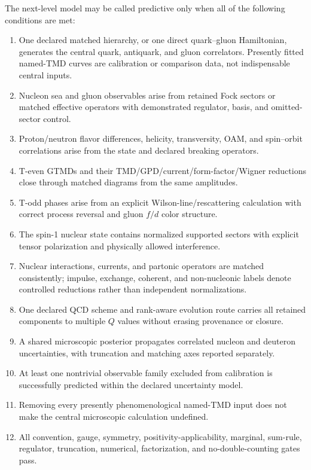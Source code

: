 \documentclass[11pt]{article}
\begin{document}
The next-level model may be called predictive only when all of the following
conditions are met:
\begin{enumerate}
\item One declared matched hierarchy, or one direct quark--gluon Hamiltonian,
generates the central quark, antiquark, and gluon correlators.  Presently
fitted named-TMD curves are calibration or comparison data, not indispensable
central inputs.
\item Nucleon sea and gluon observables arise from retained Fock sectors or
matched effective operators with demonstrated regulator, basis, and omitted-
sector control.
\item Proton/neutron flavor differences, helicity, transversity, OAM, and
spin--orbit correlations arise from the state and declared breaking
operators.
\item T-even GTMDs and their TMD/GPD/current/form-factor/Wigner reductions
close through matched diagrams from the same amplitudes.
\item T-odd phases arise from an explicit Wilson-line/rescattering
calculation with correct process reversal and gluon \(f/d\) color structure.
\item The spin-1 nuclear state contains normalized supported sectors with
explicit tensor polarization and physically allowed interference.
\item Nuclear interactions, currents, and partonic operators are matched
consistently; impulse, exchange, coherent, and non-nucleonic labels denote
controlled reductions rather than independent normalizations.
\item One declared QCD scheme and rank-aware evolution route carries all
retained components to multiple \(Q\) values without erasing provenance or
closure.
\item A shared microscopic posterior propagates correlated nucleon and
deuteron uncertainties, with truncation and matching axes reported
separately.
\item At least one nontrivial observable family excluded from calibration is
successfully predicted within the declared uncertainty model.
\item Removing every presently phenomenological named-TMD input does not make
the central microscopic calculation undefined.
\item All convention, gauge, symmetry, positivity-applicability, marginal,
sum-rule, regulator, truncation, numerical, factorization, and
no-double-counting gates pass.
\end{enumerate}
\end{document}
